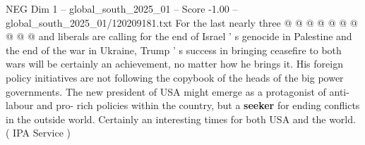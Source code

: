 \begin{textsample}{NEG Dim 1 – global\_south\_2025\_01 – Score -1.00 – global\_south\_2025\_01/120209181.txt}
For the last nearly three @ @ @ @ @ @ @ @ @ @ and liberals are calling for the end of Israel ' s genocide in Palestine and the end of the war in Ukraine, Trump ' s success in bringing ceasefire to both wars will be certainly an achievement, no matter how he brings it.
His foreign policy initiatives are not following the copybook of the heads of the big power governments.
The new president of USA might emerge as a protagonist of anti-labour and pro- rich policies within the country, but a \textbf{seeker} for ending conflicts in the outside world.
Certainly an interesting times for both USA and the world. ( IPA Service )

\end{textsample}
